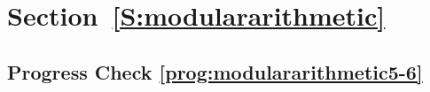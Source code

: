 \section*{Section~\ref{S:modulararithmetic}}

%
%
%


\subsection*{Progress Check \ref{prog:modulararithmetic5-6}}

